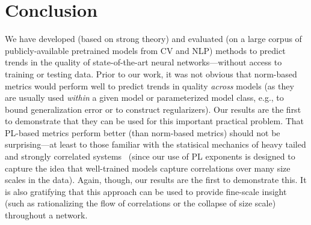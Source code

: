 \section{Conclusion}
\label{sxn:conc}

We have developed (based on strong theory) and evaluated (on a large corpus of publicly-available pretrained models from CV and NLP) methods to predict trends in the quality of state-of-the-art neural networks---without access to training or testing data.
Prior to our work, it was not obvious that norm-based metrics would perform well to predict trends in quality \emph{across} models (as they are usually used \emph{within} a given model or parameterized model class, e.g., to bound generalization error or to construct regularizers).
Our results are the first to demonstrate that they can be used for this important practical problem.
That PL-based metrics perform better (than norm-based metrics) should not be surprising---at least to those familiar with the statisical mechanics of heavy tailed and strongly correlated systems~\cite{BouchaudPotters03, SornetteBook, BP11, bun2017} (since our use of PL exponents is designed to capture the idea that well-trained models capture correlations over many size scales in the data).
Again, though, our results are the first to demonstrate this.
It is also gratifying that this approach can be used to provide fine-scale insight (such as rationalizing the flow of correlations or the collapse of size scale) throughout a network. 



